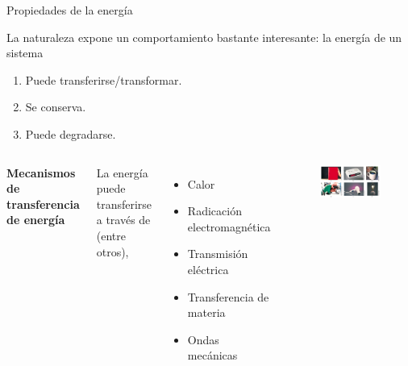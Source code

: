     \begin{frame}{Propiedades de la energía}
        
        \pause La naturaleza expone un comportamiento bastante interesante: la energía de un sistema
        
        \begin{enumerate}
            \pause \item Puede transferirse/transformar.
            
            \pause \item Se conserva.
            
            \pause \item Puede degradarse.
        \end{enumerate}
        
        \begin{columns}
            \column[t]{6cm}
            
            \pause \textbf{Mecanismos de transferencia de energía}
            
            \pause La energía puede transferirse a través de (entre otros),
            
            \begin{itemize}
                \pause \item Calor
                \pause \item Radicación electromagnética
                \pause \item Transmisión eléctrica
                \pause \item Transferencia de materia
                \pause \item Ondas mecánicas
            \end{itemize}
            
            \column[t]{6cm}
            
            \begin{figure}
            \centering
            \includegraphics[scale=0.2]{figures/Mecanismos.png}
            \end{figure}
            
            
        \end{columns}
        
\begin{columns}
    
\end{columns}
        
    \end{frame}
    
